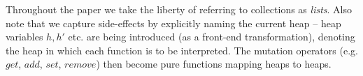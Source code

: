 \documentclass[runningheads,a4paper]{llncs}
\begin{document}
Throughout the paper we take the liberty of
referring to collections as {\em lists}. %
Also note that we capture side-effects by explicitly naming the current heap
-- heap variables $h, h'$ etc. are being introduced (as a front-end transformation), 
denoting the heap in which
each function is to be interpreted.  The mutation operators (e.g.  $get$,
$add$, $set$, $remove$) then become pure functions mapping heaps to heaps. 

\end{document}
